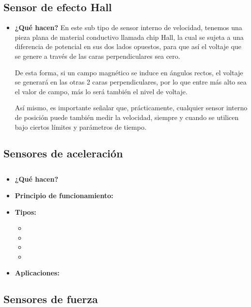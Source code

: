 \subsection*{Sensor de efecto Hall}
\begin{itemize}
	\item \textbf{¿Qué hacen?} En este sub tipo de sensor interno de velocidad, tenemos una pieza plana de material conductivo llamada chip Hall, la cual se sujeta a una diferencia de potencial en sus dos lados opuestos, para que así el voltaje que se genere a través de las caras perpendiculares sea cero.
	
	De esta forma, si un campo magnético se induce en ángulos rectos, el voltaje se generará en las otras 2 caras perpendiculares, por lo que entre más alto sea el valor de campo, más lo será también el nivel de voltaje.
	
	Así mismo, es importante señalar que, prácticamente, cualquier sensor interno de posición puede también medir la velocidad, siempre y cuando se utilicen bajo ciertos límites y parámetros de tiempo.
	
\end{itemize}



\subsection{Sensores de aceleración}
\subsection*{}
\begin{itemize}
	\item \textbf{¿Qué hacen?}
	\item \textbf{Principio de funcionamiento:}
	\item \textbf{Tipos:}
		\begin{itemize}
		\item \text{} 
		\item \text{} 
		\item \text{} 
		\item \text{}
		\end{itemize}
	\item \textbf{Aplicaciones:} 
\end{itemize}
\subsection{Sensores de fuerza}
